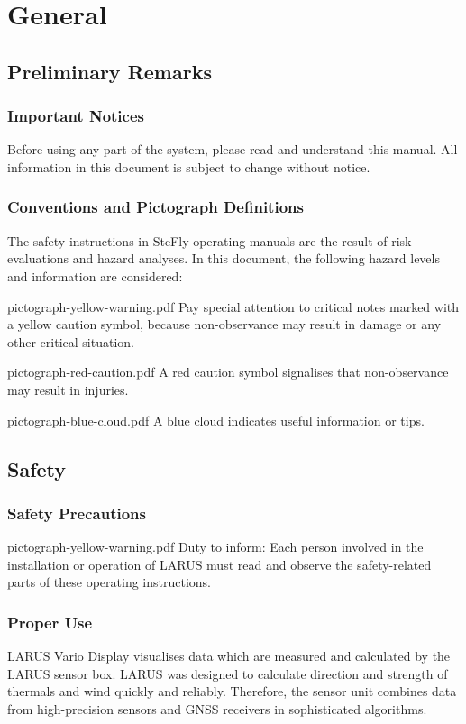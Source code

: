 \section{General}

\subsection{Preliminary Remarks}

\subsubsection{Important Notices}

Before using any part of the system, please read and understand this manual. All information in this
document is subject to change without notice.


\subsubsection{Conventions and Pictograph Definitions}

The safety instructions in SteFly operating manuals are the result of risk evaluations and hazard
analyses. In this document, the following hazard levels and information are considered:

\picnote
	{pictograph-yellow-warning.pdf}
	{Pay special attention to critical notes marked with a yellow caution symbol, because
	non-observance may result in damage or any other critical situation.}

\picnote
	{pictograph-red-caution.pdf}
	{A red caution symbol signalises that non-observance may result in injuries.}

\picnote
	{pictograph-blue-cloud.pdf}
	{A blue cloud indicates useful information or tips.}

\subsection{Safety}

\subsubsection{Safety Precautions}
\picnote
	{pictograph-yellow-warning.pdf}
	{Duty to inform: Each person involved in the installation or operation of LARUS must read and observe the 
	safety-related parts of these operating instructions.}


\subsubsection{Proper Use}
LARUS Vario Display visualises data which are measured and calculated by the LARUS sensor box.
LARUS was designed to calculate direction and strength of thermals and wind quickly and reliably.
Therefore, the sensor unit combines data from high-precision sensors and GNSS receivers in
sophisticated algorithms.

